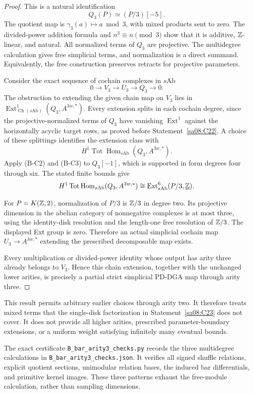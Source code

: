 \begin{proof}
This is a natural identification
\begin{equation}
 Q_3(P)\simeq(P/3)[-5].
 \tag{B-C5}
\end{equation}
The quotient map is
$\gamma_3(a)\mapsto a\bmod3$, with
mixed products sent to zero.
The divided-power addition formula
and $n^3\equiv n\pmod3$ show that it
is additive, $\mathbb Z$-linear, and natural.
All normalized terms of $Q_3$ are
projective. The multidegree calculation
gives free simplicial terms, and
normalization is a direct summand.
Equivalently, the free construction
preserves retracts for projective
parameters.

Consider the exact sequence of cochain
complexes in $s\mathrm{Ab}$
\[
 0\longrightarrow V_3\longrightarrow U_3
       \longrightarrow Q_3\longrightarrow0.
\]
The obstruction to extending the given
chain map on $V_3$ lies in
$\operatorname{Ext}^1_{\operatorname{Ch}(s\mathrm{Ab})}
(Q_3,A^{3w,*})$.
Every extension splits in each cochain
degree, since the projective-normalized
terms of $Q_3$ have vanishing
$\operatorname{Ext}^1$ against the
horizontally acyclic target rows, as
proved before Statement~\ref{sa08:C22}.
A choice of these splittings identifies
the extension class with
\[
 H^1\operatorname{Tot}
       \operatorname{Hom}_{s\mathrm{Ab}}(Q_3,A^{3w,*}).
\]
Apply (B-C2) and (B-C3) to $Q_3[-1]$,
which is supported in form degrees
four through six. The stated finite
bounds give
\[
 H^1\operatorname{Tot}
       \operatorname{Hom}_{s\mathrm{Ab}}(Q_3,A^{3w,*})
 \cong
 \operatorname{Ext}^6_{s\mathrm{Ab}}
       (P/3,\underline{\mathbb Z}).
\]

For $P=K(\mathbb Z,2)$, normalization of
$P/3$ is $\mathbb Z/3$ in degree two.
Its projective dimension in the
abelian category of nonnegative
complexes is at most three, using
the identity-disk resolution and the
length-one free resolution of $\mathbb Z/3$.
The displayed Ext group is zero.
Therefore an actual simplicial
cochain map $U_3\to A^{3w,*}$
extending the prescribed decomposable
map exists.

Every multiplication or divided-power
identity whose output has arity three
already belongs to $V_3$. Hence this
chain extension, together with the
unchanged lower arities, is precisely
a partial strict simplicial PD-DGA
map through arity three.
\end{proof}

This result permits arbitrary earlier choices
through arity two. It therefore treats mixed
terms that the single-disk factorization in
Statement~\ref{sa08:C23} does not cover.
It does not provide all higher arities,
prescribed parameter-boundary extensions,
or a uniform weight satisfying infinitely
many eventual bounds.

The exact certificate
\texttt{B\_bar\_arity3\_checks.py} records
the three multidegree calculations in
\texttt{B\_bar\_arity3\_checks.json}.
It verifies all signed shuffle relations,
explicit quotient sections, unimodular
relation bases, the induced bar
differentials, and primitive kernel
images. These three patterns exhaust
the free-module calculation, rather
than sampling dimensions.
